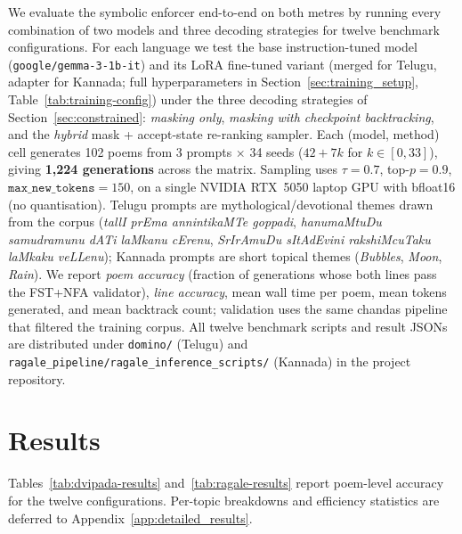 \documentclass[11pt]{article}
\begin{document}
We evaluate the symbolic enforcer end-to-end on both metres by running
every combination of two models and three decoding strategies for
twelve benchmark configurations. For each language we test the base
instruction-tuned model (\texttt{google/gemma-3-1b-it}) and its LoRA
fine-tuned variant (merged for Telugu, adapter for Kannada; full
hyperparameters in Section~\ref{sec:training_setup},
Table~\ref{tab:training-config}) under the three decoding strategies of
Section~\ref{sec:constrained}: \textit{masking only},
\textit{masking with checkpoint backtracking}, and the \textit{hybrid}
mask + accept-state re-ranking sampler. Each (model, method) cell generates 102
poems from 3 prompts $\times$ 34 seeds ($42 + 7k$ for $k\in[0,33]$),
giving \textbf{1{,}224 generations} across the matrix. Sampling uses
$\tau=0.7$, top-$p=0.9$, $\texttt{max\_new\_tokens}=150$, on a single
NVIDIA RTX~5050 laptop GPU with bfloat16 (no quantisation). Telugu
prompts are mythological/devotional themes drawn from the corpus
(\textit{tallI prEma annintikaMTe goppadi},
\textit{hanumaMtuDu samudramunu dATi laMkanu cErenu},
\textit{SrIrAmuDu sItAdEvini rakshiMcuTaku laMkaku veLLenu});
Kannada prompts are short topical themes (\textit{Bubbles},
\textit{Moon}, \textit{Rain}). We report \textit{poem accuracy} (fraction
of generations whose both lines pass the FST+NFA validator),
\textit{line accuracy}, mean wall time per poem, mean tokens generated,
and mean backtrack count; validation uses the same chandas pipeline
that filtered the training corpus. All twelve benchmark scripts and
result JSONs are distributed under
\texttt{domino/}\allowbreak{} (Telugu) and
\texttt{ragale\_pipeline/}\allowbreak\texttt{ragale\_\allowbreak inference\_\allowbreak scripts/}
(Kannada) in the project repository.

\section{Results}
\label{sec:results}

Tables~\ref{tab:dvipada-results} and~\ref{tab:ragale-results} report
poem-level accuracy for the twelve configurations. Per-topic breakdowns and
efficiency statistics are deferred to
Appendix~\ref{app:detailed_results}.
\end{document}
